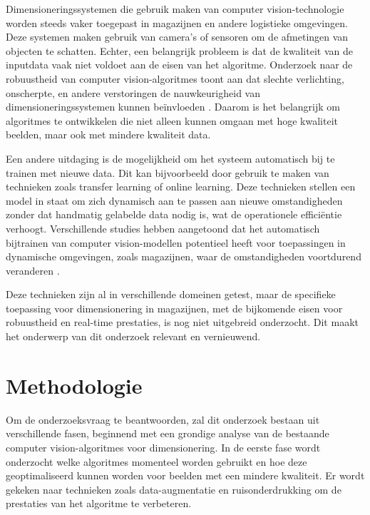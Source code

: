 Dimensioneringssystemen die gebruik maken van computer vision-technologie worden steeds vaker toegepast in magazijnen en andere logistieke omgevingen. Deze systemen maken gebruik van camera’s of sensoren om de afmetingen van objecten te schatten. \autocite{getcameras} Echter, een belangrijk probleem is dat de kwaliteit van de inputdata vaak niet voldoet aan de eisen van het algoritme. Onderzoek naar de robuustheid van computer vision-algoritmes toont aan dat slechte verlichting, onscherpte, en andere verstoringen de nauwkeurigheid van dimensioneringssystemen kunnen beïnvloeden \autocite{DeepCorrect}. Daarom is het belangrijk om algoritmes te ontwikkelen die niet alleen kunnen omgaan met hoge kwaliteit beelden, maar ook met mindere kwaliteit data.

Een andere uitdaging is de mogelijkheid om het systeem automatisch bij te trainen met nieuwe data. Dit kan bijvoorbeeld door gebruik te maken van technieken zoals transfer learning of online learning. Deze technieken stellen een model in staat om zich dynamisch aan te passen aan nieuwe omstandigheden zonder dat handmatig gelabelde data nodig is, wat de operationele efficiëntie verhoogt. Verschillende studies hebben aangetoond dat het automatisch bijtrainen van computer vision-modellen potentieel heeft voor toepassingen in dynamische omgevingen, zoals magazijnen, waar de omstandigheden voortdurend veranderen \autocite{AdaptLearn} \autocite{MDPI2}.

Deze technieken zijn al in verschillende domeinen getest, maar de specifieke toepassing voor dimensionering in magazijnen, met de bijkomende eisen voor robuustheid en real-time prestaties, is nog niet uitgebreid onderzocht. Dit maakt het onderwerp van dit onderzoek relevant en vernieuwend.


\section{Methodologie}
\label{sec:methodologie}

Om de onderzoeksvraag te beantwoorden, zal dit onderzoek bestaan uit verschillende fasen, beginnend met een grondige analyse van de bestaande computer vision-algoritmes voor dimensionering. In de eerste fase wordt onderzocht welke algoritmes momenteel worden gebruikt en hoe deze geoptimaliseerd kunnen worden voor beelden met een mindere kwaliteit. Er wordt gekeken naar technieken zoals data-augmentatie en ruisonderdrukking om de prestaties van het algoritme te verbeteren.

